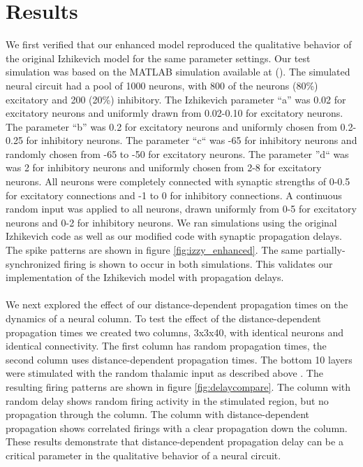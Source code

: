 \documentclass[a4paper,11pt]{article}
\begin{document}
\section{Results}
We first verified that our enhanced model reproduced the qualitative behavior of the original Izhikevich model for the same parameter settings.
Our test simulation was based on the MATLAB simulation available at (\cite{izzy_code}).
The simulated neural circuit had a pool of 1000 neurons, with 800 of the neurons (80\%) excitatory and 200 (20\%) inhibitory.
The Izhikevich parameter ``a'' was 0.02 for excitatory neurons and uniformly drawn from 0.02-0.10 for excitatory neurons.
The parameter ``b'' was 0.2 for excitatory neurons and uniformly chosen from 0.2-0.25 for inhibitory neurons.
The parameter ``c`` was -65 for inhibitory neurons and randomly chosen from -65 to -50 for excitatory neurons.
The parameter ''d`` was was 2 for inhibitory neurons and uniformly chosen from 2-8 for excitatory neurons.
All neurons were completely connected with synaptic strengths of 0-0.5 for excitatory connections and -1 to 0 for inhibitory connections.
A continuous random input was applied to all neurons, drawn uniformly from 0-5 for excitatory neurons and 0-2 for inhibitory neurons.
We ran simulations using the original Izhikevich code as well as our modified code with synaptic propagation delays.
The spike patterns are shown in figure \ref{fig:izzy_enhanced}.
The same partially-synchronized firing is shown to occur in both simulations. 
This validates our implementation of the Izhikevich model with propagation delays.
\\ \\
We next explored the effect of our distance-dependent propagation times on the dynamics of a neural column.
To test the effect of the distance-dependent propagation times we created two columns, 3x3x40,  with identical neurons and identical connectivity.
The first column has random propagation times, the second column uses distance-dependent propagation times.
The bottom 10 layers were stimulated with the random thalamic input as described above \cite{izhikevich2003}.
The resulting firing patterns are shown in figure \ref{fig:delaycompare}.
The column with random delay shows random firing activity in the stimulated region, but no propagation through the column.
The column with distance-dependent propagation shows correlated firings with a clear propagation down the column.
These results demonstrate that distance-dependent propagation delay can be a critical parameter in the qualitative behavior of a neural circuit.
\end{document}

